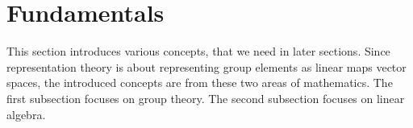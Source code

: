 \section{Fundamentals}

This section introduces various concepts, that we need in later sections.
Since representation theory is about representing group elements as linear maps vector spaces, the introduced concepts are from these two areas of mathematics.
The first subsection focuses on group theory.
The second subsection focuses on linear algebra.



